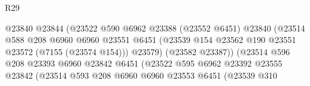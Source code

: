 \begin{lexlean}{R29}
\begin{coremodule}
                                              @23840
                                              @23844
                                              (@23522
                                                @590
                                                @6962
                                                @23388
                                                (@23552 @6451)
                                                @23840
                                                (@23514
                                                  @588
                                                  @208
                                                  @6960
                                                  @6960
                                                  @23551
                                                  @6451
                                                  (@23539
                                                    @154
                                                    @23562
                                                    @190
                                                    @23551
                                                    @23572
                                                    (@7155 (@23574 @154)))
                                                  @23579)
                                                (@23582 @23387))
                                              (@23514
                                                @596
                                                @208
                                                @23393
                                                @6960
                                                @23842
                                                @6451
                                                (@23522
                                                  @595
                                                  @6962
                                                  @23392
                                                  @23555
                                                  @23842
                                                  (@23514
                                                    @593
                                                    @208
                                                    @6960
                                                    @6960
                                                    @23553
                                                    @6451
                                                    (@23539
                                                      @310

\end{coremodule}
\end{lexlean}
